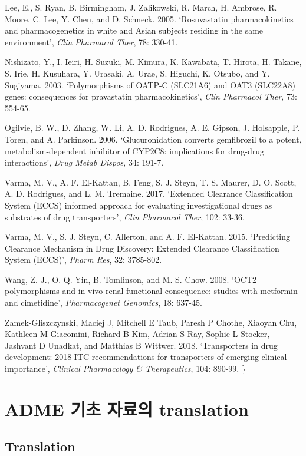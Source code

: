 \documentclass[
  11pt,
  krantz2, a4paper, twoside]{krantz}
\begin{document}
Lee, E., S. Ryan, B. Birmingham, J. Zalikowski, R. March, H. Ambrose, R.
Moore, C. Lee, Y. Chen, and D. Schneck. 2005. `Rosuvastatin
pharmacokinetics and pharmacogenetics in white and Asian subjects
residing in the same environment', \emph{Clin Pharmacol Ther}, 78: 330-41.

Nishizato, Y., I. Ieiri, H. Suzuki, M. Kimura, K. Kawabata, T. Hirota,
H. Takane, S. Irie, H. Kusuhara, Y. Urasaki, A. Urae, S. Higuchi, K.
Otsubo, and Y. Sugiyama. 2003. `Polymorphisms of OATP-C (SLC21A6) and
OAT3 (SLC22A8) genes: consequences for pravastatin pharmacokinetics',
\emph{Clin Pharmacol Ther}, 73: 554-65.

Ogilvie, B. W., D. Zhang, W. Li, A. D. Rodrigues, A. E. Gipson, J.
Holsapple, P. Toren, and A. Parkinson. 2006. `Glucuronidation converts
gemfibrozil to a potent, metabolism-dependent inhibitor of CYP2C8:
implications for drug-drug interactions', \emph{Drug Metab Dispos}, 34:
191-7.

Varma, M. V., A. F. El-Kattan, B. Feng, S. J. Steyn, T. S. Maurer, D. O.
Scott, A. D. Rodrigues, and L. M. Tremaine. 2017. `Extended Clearance
Classification System (ECCS) informed approach for evaluating
investigational drugs as substrates of drug transporters', \emph{Clin
Pharmacol Ther}, 102: 33-36.

Varma, M. V., S. J. Steyn, C. Allerton, and A. F. El-Kattan. 2015.
`Predicting Clearance Mechanism in Drug Discovery: Extended Clearance
Classification System (ECCS)', \emph{Pharm Res}, 32: 3785-802.

Wang, Z. J., O. Q. Yin, B. Tomlinson, and M. S. Chow. 2008. `OCT2
polymorphisms and in-vivo renal functional consequence: studies with
metformin and cimetidine', \emph{Pharmacogenet Genomics}, 18: 637-45.

Zamek‐Gliszczynski, Maciej J, Mitchell E Taub, Paresh P Chothe, Xiaoyan
Chu, Kathleen M Giacomini, Richard B Kim, Adrian S Ray, Sophie L
Stocker, Jashvant D Unadkat, and Matthias B Wittwer. 2018. `Transporters
in drug development: 2018 ITC recommendations for transporters of
emerging clinical importance', \emph{Clinical Pharmacology \& Therapeutics},
104: 890-99. \}

\part{ADME 기초 자료의 translation}\label{part-adme-uxae30uxcd08-uxc790uxb8ccuxc758-translation}

\chapter{Translation}\label{translation}
\end{document}
